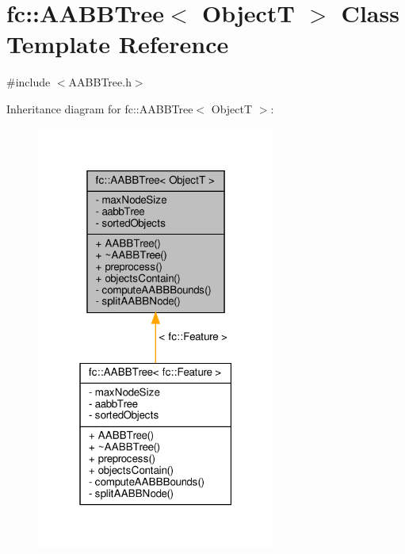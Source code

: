 \hypertarget{classfc_1_1AABBTree}{}\section{fc\+:\+:A\+A\+B\+B\+Tree$<$ ObjectT $>$ Class Template Reference}
\label{classfc_1_1AABBTree}


{\ttfamily \#include $<$A\+A\+B\+B\+Tree.\+h$>$}



Inheritance diagram for fc\+:\+:A\+A\+B\+B\+Tree$<$ ObjectT $>$\+:
\nopagebreak
\begin{figure}[H]
\begin{center}
\leavevmode
\includegraphics[width=223pt]{dd/d48/classfc_1_1AABBTree__inherit__graph}
\end{center}
\end{figure}


